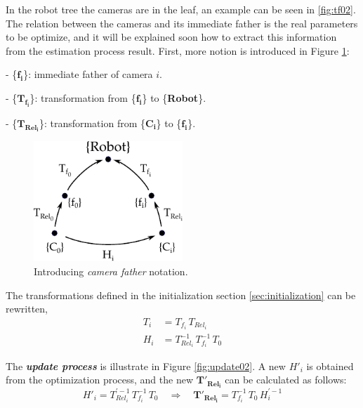 In the robot tree the cameras are in the leaf, an example can be seen in \ref{fig:tf02}. The relation between the cameras and its immediate father is the real parameters to be optimize, and it will be explained soon how to extract this information from the estimation process result. First, more notion is introduced in Figure \ref{fig:update01}:
\begin{itemize*}
 \item[-]  \{$\mathbf{f_i}$\}: immediate father of camera $i$.

 \item[-]  \{$\mathbf{T_{f_i}}$\}: transformation from \{$\mathbf{f_i}$\} to \{\textbf{Robot}\}.

 \item[-]  \{$\mathbf{T_{Rel_i}}$\}: transformation from \{$\mathbf{C_i}$\} to \{$\mathbf{f_i}$\}.

\end{itemize*}

\begin{figure}[!htbp]
 \centering
 \includegraphics[width=0.5\textwidth]{images/update01.pdf}
 \caption{Introducing \textit{camera father} notation.}
 \label{fig:update01}
\end{figure}

The transformations defined in the initialization section \ref{sec:initialization} can be rewritten,
\begin{align}
 T_i &= T_{f_i} \, T_{Rel_i} \\
 H_i &= T_{Rel_i}^{-1} \, T_{f_i}^{-1} \, T_0
\end{align}


The \textit{\textbf{update process}} is illustrate in Figure \ref{fig:update02}.
A new $H'_i$ is obtained from the optimization process, and the new $\mathbf{T'_{Rel_i}}$ can be calculated as follows:
\begin{equation}
 H'_i = T_{Rel_i}^{' -1} \, T_{f_i}^{-1} \, T_0  \quad \Rightarrow \quad  \mathbf{T'_{Rel_i}} = T_{f_i}^{-1} \, T_0 \, H_{i}^{' -1}
\end{equation}

